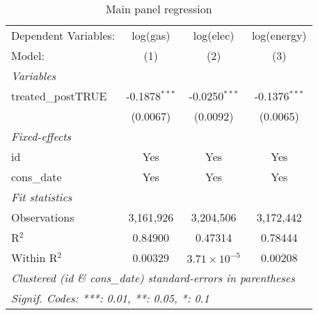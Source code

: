 
\begin{table}[htbp]
   \centering
   \caption{Main panel regression\label{tab:maintwfe}}
   \begin{tabular}{lccc}
      \tabularnewline\midrule\midrule
      Dependent Variables: & log(gas)        & log(elec)             & log(energy)\\
      Model:               & (1)             & (2)                   & (3)\\
      \midrule \emph{Variables} &   &   &  \\
      treated\_postTRUE   & -0.1878$^{***}$ & -0.0250$^{***}$       & -0.1376$^{***}$\\
                           & (0.0067)        & (0.0092)              & (0.0065)\\
      \midrule \emph{Fixed-effects} &   &   &  \\
      id                   & Yes             & Yes                   & Yes\\
      cons\_date          & Yes             & Yes                   & Yes\\
      \midrule \emph{Fit statistics} &   &   &  \\
      Observations         & 3,161,926       & 3,204,506             & 3,172,442\\
      R$^2$                & 0.84900         & 0.47314               & 0.78444\\
      Within R$^2$         & 0.00329         & $3.71\times 10^{-5}$ & 0.00208\\
      \midrule\midrule\multicolumn{4}{l}{\emph{Clustered (id \& cons\_date) standard-errors in parentheses}}\\
      \multicolumn{4}{l}{\emph{Signif. Codes: ***: 0.01, **: 0.05, *: 0.1}}\\
   \end{tabular}
\end{table}


